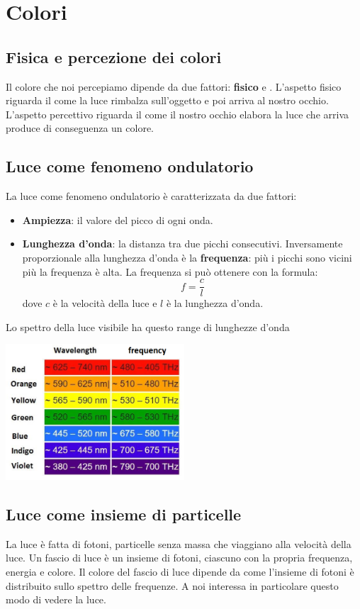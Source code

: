 \chapter{Colori}

\section{Fisica e percezione dei colori}
Il colore che noi percepiamo dipende da due fattori: \textbf{fisico} e \textbf{}.
L'aspetto fisico riguarda il come la luce rimbalza sull'oggetto e poi arriva al
nostro occhio. L'aspetto percettivo riguarda il come il nostro occhio elabora la
luce che arriva produce di conseguenza un colore.

\section{Luce come fenomeno ondulatorio}
La luce come fenomeno ondulatorio \`e caratterizzata da due fattori:
\begin{itemize}
	\item \textbf{Ampiezza}: il valore del picco di ogni onda.
	\item \textbf{Lunghezza d'onda}: la distanza tra due picchi consecutivi. Inversamente
	      proporzionale alla lunghezza d'onda \`e la \textbf{frequenza}: pi\`u i picchi sono
	      vicini pi\`u la frequenza \`e alta. La frequenza si pu\`o ottenere con la formula:
	      \[ f = \frac{c}{l} \]
	      dove $c$ \`e la velocit\`a della luce e $l$ \`e la lunghezza d'onda.
\end{itemize}
Lo spettro della luce visibile ha questo range di lunghezze d'onda

\begin{center}
	\includegraphics[width=0.5\textwidth]{immagini/spettro_visibile}
\end{center}

\section{Luce come insieme di particelle}
La luce \`e fatta di fotoni, particelle senza massa che viaggiano alla velocit\`a della luce.
Un fascio di luce \`e un insieme di fotoni, ciascuno con la propria frequenza, energia e
colore. Il colore del fascio di luce dipende da come l'insieme di fotoni \`e distribuito sullo
spettro delle frequenze. A noi interessa in particolare questo modo di vedere la luce.

